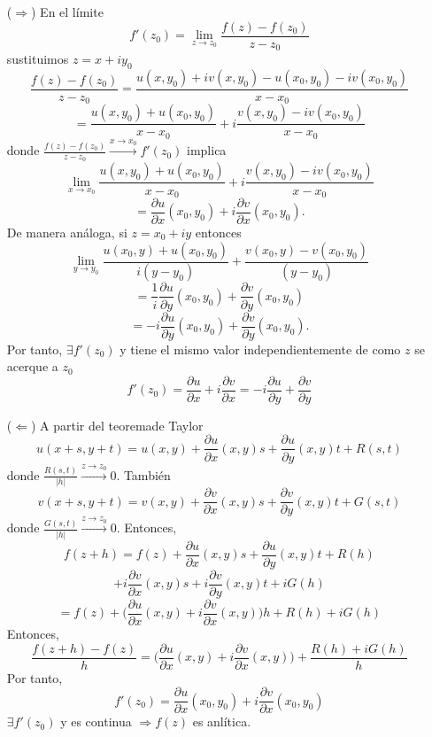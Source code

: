 \begin{dem}
  \begin{enumerate}[label=(\roman*)]
    \item []
    \item [($\Rightarrow$)] En el límite
      \[ 
        f'(z_{0}) = \lim_{z \to z_{0}} \frac{f(z) - f(z_{0})}{z - z_{0}}
      \] 
      sustituimos $z = x + iy_{0}$
      \[ 
        \frac{f(z) - f(z_{0})}{z - z_{0}} = \frac{u(x, y_{0}) + i v(x, y_{0}) - u(x_{0},y_{0}) - i v(x_{0}, y_{0})}{x - x_{0}}
      \]
      \[ 
      = \frac{u(x, y_{0}) +  u(x_{0}, y_{0})}{x - x_{0}} + i \frac{v(x,y_{0}) - i v(x_{0}, y_{0})}{x - x_{0}}
      \] 
      donde $\frac{f(z) - f(z_{0})}{z - z_{0}} \xrightarrow[]{x \rightarrow x_{0}} f'(z_{0})$ implica
      \[ 
        \lim_{x \to x_{0}} \frac{u(x, y_{0}) +  u(x_{0}, y_{0})}{x - x_{0}} + i \frac{v(x,y_{0}) - i v(x_{0}, y_{0})}{x - x_{0}} 
      \]
      \[ 
        = \frac{\partial{u}}{\partial{x}}(x_{0}, y_{0}) + i \frac{\partial{v}}{\partial{x}}(x_{0}, y_{0}).
      \] 
      De manera análoga, si $z = x_{0} + i y$ entonces
      \[ 
      \lim_{y \to y_{0}} \frac{u(x_{0}, y) +  u(x_{0}, y_{0})}{i(y - y_{0})} +  \frac{v(x_{0},y) -  v(x_{0}, y_{0})}{(y - y_{0})} 
      \]
      \[ = \frac{1}{i}\frac{\partial{u}}{\partial{y}}(x_{0}, y_{0}) + \frac{\partial{v}}{\partial{y}}(x_{0}, y_{0})
      \]
      \[ 
         = - i\frac{\partial{u}}{\partial{y}}(x_{0}, y_{0}) + \frac{\partial{v}}{\partial{y}}(x_{0}, y_{0}).
      \] 
      Por tanto, $\exists f'(z_{0})$ y tiene el mismo valor independientemente de como $z$ se acerque a $z_{0}$
      \[ 
        f'(z_{0}) = \frac{\partial{u}}{\partial{x}} + i\frac{\partial{v}}{\partial{x}} =  - i\frac{\partial{u}}{\partial{y}} + \frac{\partial{v}}{\partial{y}}
      \] 
    \item [($\Leftarrow$)] A partir del teoremade Taylor
      \[ 
        u(x + s, y + t) = u(x, y) + \frac{\partial{u}}{\partial{x}}(x, y)s + \frac{\partial{u}}{\partial{y}}(x, y)t + R(s, t) 
      \] 
      donde $\frac{R(s,t)}{| h |} \xrightarrow[]{ z \rightarrow z_{0}} 0 $. También
      \[ 
        v(x + s, y + t) = v(x, y) + \frac{\partial{v}}{\partial{x}}(x, y)s + \frac{\partial{v}}{\partial{y}}(x, y)t + G(s, t) 
      \] 
      donde $\frac{G(s,t)}{| h |} \xrightarrow[]{ z \rightarrow z_{0}} 0 $. Entonces,
      \[ 
         f(z + h) = f(z) + \frac{\partial{u}}{\partial{x}}(x, y)s + \frac{\partial{u}}{\partial{y}}(x, y)t + R(h) 
      \] 
      \[ 
        + i\frac{\partial{v}}{\partial{x}}(x, y)s + i\frac{\partial{v}}{\partial{y}}(x, y)t + iG(h) 
      \] 
      \[
        = f(z) + \Big ( \frac{\partial{u}}{\partial{x}}(x, y) + i\frac{\partial{v}}{\partial{x}}(x, y) \Big )h + R(h) + iG(h)
      \] 
      Entonces,
      \[ 
        \frac{f(z + h) - f(z)}{h} = \Big ( \frac{\partial{u}}{\partial{x}}(x, y) + i\frac{\partial{v}}{\partial{x}}(x, y) \Big ) + \frac{R(h) + iG(h)}{h}
      \] 
      Por tanto,
      \[ 
        f'(z_{0}) = \frac{\partial{u}}{\partial{x}}(x_{0}, y_{0}) + i \frac{\partial{v}}{\partial{x}}(x_{0}, y_{0}) 
      \] 
      $\exists f'(z_{0})$ y es continua $\Rightarrow f(z)$ es anlítica.
  \end{enumerate}
\end{dem}


